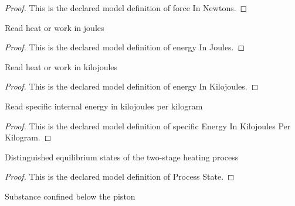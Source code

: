 \begin{proof}
  This is the declared model definition of force In Newtons.
\end{proof}
\begin{definition}
  \label{def:physics:phyx-mini-0463:phyxminiproblems-problemphyxmini0463-energyinjoules}
  Read heat or work in joules
\end{definition}
\begin{proof}
  This is the declared model definition of energy In Joules.
\end{proof}
\begin{definition}
  \label{def:physics:phyx-mini-0463:phyxminiproblems-problemphyxmini0463-energyinkilojoules}
  Read heat or work in kilojoules
\end{definition}
\begin{proof}
  This is the declared model definition of energy In Kilojoules.
\end{proof}
\begin{definition}
  \label{def:physics:phyx-mini-0463:phyxminiproblems-problemphyxmini0463-specificenergyinkilojoulesperkilogram}
  Read specific internal energy in kilojoules per kilogram
\end{definition}
\begin{proof}
  This is the declared model definition of specific Energy In Kilojoules Per Kilogram.
\end{proof}
\begin{definition}
  \label{def:physics:phyx-mini-0463:phyxminiproblems-problemphyxmini0463-processstate}
  Distinguished equilibrium states of the two-stage heating process
\end{definition}
\begin{proof}
  This is the declared model definition of Process State.
\end{proof}
\begin{definition}
  \label{def:physics:phyx-mini-0463:phyxminiproblems-problemphyxmini0463-fluidsubstance}
  Substance confined below the piston
\end{definition}
